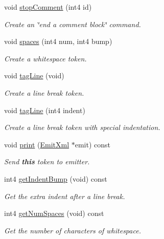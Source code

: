 \begin{DoxyCompactItemize}
void \mbox{\hyperlink{class_token_split_ac93137757a2cc85219ef8cd5fb994a6c}{stop\+Comment}} (int4 id)
\begin{DoxyCompactList}\small\item\em Create an \char`\"{}end a comment block\char`\"{} command. \end{DoxyCompactList}\item 
void \mbox{\hyperlink{class_token_split_a2aa41522a98675a88eda3dc730e1ab1c}{spaces}} (int4 num, int4 bump)
\begin{DoxyCompactList}\small\item\em Create a whitespace token. \end{DoxyCompactList}\item 
void \mbox{\hyperlink{class_token_split_a8723540e91b976c88ad9eadabc9ae54c}{tag\+Line}} (void)
\begin{DoxyCompactList}\small\item\em Create a line break token. \end{DoxyCompactList}\item 
void \mbox{\hyperlink{class_token_split_aa61bb2fa64ac1ebce6982bfb173a4bf5}{tag\+Line}} (int4 indent)
\begin{DoxyCompactList}\small\item\em Create a line break token with special indentation. \end{DoxyCompactList}\item 
void \mbox{\hyperlink{class_token_split_aac6f66bf872fe4f04c8f3b44cf4efb9e}{print}} (\mbox{\hyperlink{class_emit_xml}{Emit\+Xml}} $\ast$emit) const
\begin{DoxyCompactList}\small\item\em Send {\bfseries{this}} token to emitter. \end{DoxyCompactList}\item 
int4 \mbox{\hyperlink{class_token_split_a144780df9772056e838cd27d850ce95d}{get\+Indent\+Bump}} (void) const
\begin{DoxyCompactList}\small\item\em Get the extra indent after a line break. \end{DoxyCompactList}\item 
int4 \mbox{\hyperlink{class_token_split_ae25bbe93a73752c9d36d9bbb985f2499}{get\+Num\+Spaces}} (void) const
\begin{DoxyCompactList}\small\item\em Get the number of characters of whitespace. \end{DoxyCompactList}\item 

\end{DoxyCompactItemize}
